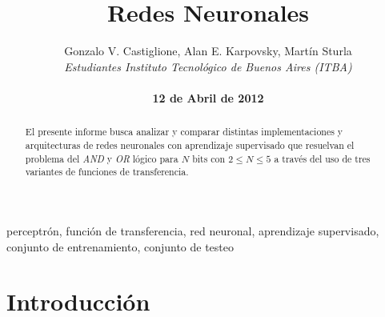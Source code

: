 \documentclass[%
    final,
    reprint,
    notitlepage,
    narroweqnarray,
    inline,
    twoside,
    invited
    ]{ieee}
\begin{document}
\title[Redes Neuronales]{%
       Redes Neuronales}

\author[Castiglione, Karpovsky, Sturla]{Gonzalo V. Castiglione, Alan E. Karpovsky, Martín Sturla\\\textit{Estudiantes 
       Instituto Tecnológico de Buenos Aires (ITBA)}\\
\\\textbf{12 de Abril de 2012}
}



\lognumber{}
\pubitemident{}


\maketitle               

\begin{abstract} 
El presente informe busca analizar y comparar distintas implementaciones y arquitecturas de redes neuronales con aprendizaje supervisado que resuelvan el problema del \textit{AND} y \textit{OR} lógico para $N$ bits con $2 \le N \le 5$ a través del uso de tres variantes de funciones de transferencia.

\end{abstract}

\begin{keywords}
perceptrón, función de transferencia, red neuronal, aprendizaje supervisado, conjunto de entrenamiento, conjunto de testeo
\end{keywords}

\section{Introducción}
\end{document}

